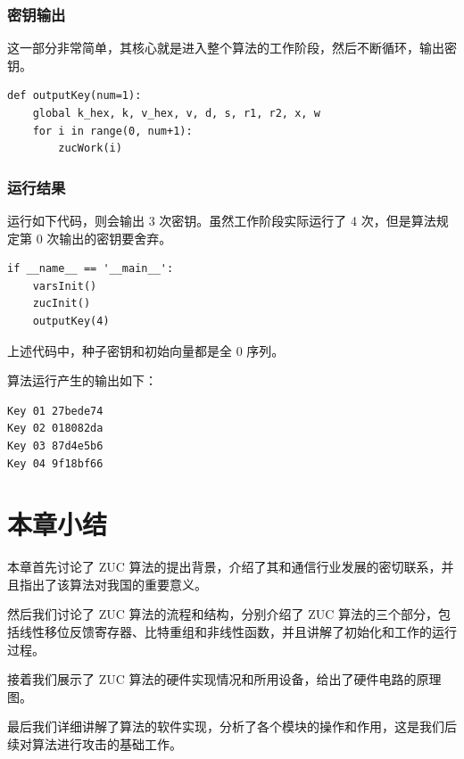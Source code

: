 \subsubsection{密钥输出}

这一部分非常简单，其核心就是进入整个算法的工作阶段，然后不断循环，输出密钥。

\begin{lstlisting}[style=myPython,label={lst:outputkey},caption={密钥输出}]
def outputKey(num=1):
    global k_hex, k, v_hex, v, d, s, r1, r2, x, w
    for i in range(0, num+1):
        zucWork(i)
\end{lstlisting}

\subsubsection{运行结果}
运行如下代码，则会输出 3 次密钥。虽然工作阶段实际运行了 4 次，但是算法规定第 0 次输出的密钥要舍弃。

\begin{lstlisting}[style=myPython,label={lst:run},caption={主函数}]
if __name__ == '__main__':
    varsInit()
    zucInit()
    outputKey(4)
\end{lstlisting}

上述代码中，种子密钥和初始向量都是全 0 序列。

算法运行产生的输出如下：

\begin{lstlisting}[style=myPython,label={lst:runresult},caption={算法运行的输出结果}]
Key 01 27bede74
Key 02 018082da
Key 03 87d4e5b6
Key 04 9f18bf66
\end{lstlisting}

\section{本章小结}

本章首先讨论了 ZUC 算法的提出背景，介绍了其和通信行业发展的密切联系，并且指出了该算法对我国的重要意义。

然后我们讨论了 ZUC 算法的流程和结构，分别介绍了 ZUC 算法的三个部分，包括线性移位反馈寄存器、比特重组和非线性函数，并且讲解了初始化和工作的运行过程。


接着我们展示了 ZUC 算法的硬件实现情况和所用设备，给出了硬件电路的原理图。

最后我们详细讲解了算法的软件实现，分析了各个模块的操作和作用，这是我们后续对算法进行攻击的基础工作。


